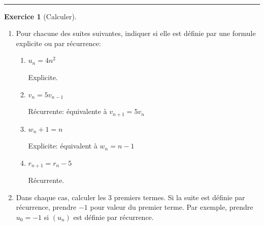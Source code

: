 \documentclass{exam}
\theoremstyle{definition}
\newtheorem{exercice}{Exercice}
\begin{document}
\Large

\vspace{5mm}

\begin{center}
\end{center}

~\\



\medskip\hrule

\begin{exercice}[Calculer]
    \begin{enumerate}
    \item Pour chacune des suites suivantes, indiquer si elle est définie par une formule explicite ou par récurrence:
    \begin{enumerate}
        \item $u_n = 4n^2$
        
        Explicite.
        \item $v_{n} = 5v_{n-1}$

        Récurrente: équivalente à $v_{n+1} = 5v_n$
        \item $w_{n} + 1 = n$
        
        Explicite: équivalent à $w_n = n - 1$
        \item $r_{n+1} = r_n - 5$

        Récurrente.
    \end{enumerate}
    
    \item Dans chaque cas, calculer les 3 premiers termes. Si la suite est définie par récurrence, prendre $-1$ pour valeur du premier terme. Par exemple, prendre $u_0 = -1$ si $(u_n)$ est définie par récurrence.%
    \end{enumerate}
    \begin{center}
    \end{center}


\end{exercice}
\end{document}
